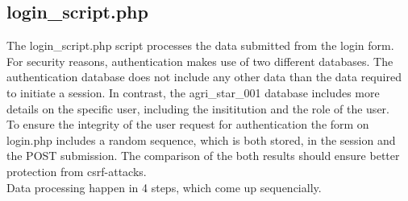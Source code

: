 \subsection{login\_script.php}\label{login_script}
The login\_script.php script processes the data submitted from the login form. For security reasons, 
authentication makes use of two different databases. The authentication database does not include any other data than the data required to initiate a session. In contrast,
the agri\_star\_001 database includes more details on the specific user, including the insititution and the role of the user.\\
To ensure the integrity of the user request for authentication the form on login.php includes a random sequence, which is both stored, in the session and the POST submission. 
The comparison of the both results should ensure better protection from csrf-attacks.\\
Data processing happen in 4 steps, which come up sequencially.
